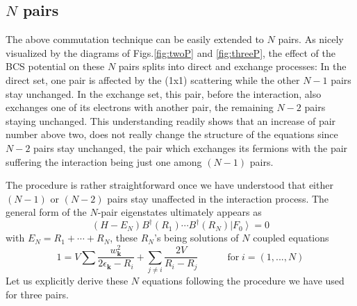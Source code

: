 \documentclass[aps,prb,superscriptaddress,showpacs,reprint,lengthcheck]{revtex4-1}
\begin{document}
\subsection{$N$ pairs}

The above commutation technique can be easily extended to $N$ pairs. As nicely
visualized by the diagrams of Figs.\ref{fig:twoP} and \ref{fig:threeP}, the
effect of the BCS potential on these $N$ pairs splits into direct and exchange processes:
In the direct set, one pair is affected by the (1x1) scattering while the other $N-1
$ pairs stay unchanged. In the exchange set, this pair, before the interaction, also 
exchanges one of its electrons with another pair, the remaining $N-2$
pairs staying unchanged. This understanding readily shows that an increase of pair number above two, does not really change the structure of the equations
since $N-2$ pairs stay unchanged, the pair which exchanges its fermions with the
pair suffering the interaction being just one among $(N-1)$ pairs.

The procedure is rather straightforward once we have understood
that either $(N-1)$ or $(N-2)$ pairs stay unaffected in the interaction process. The
general form of the $N$-pair eigenstates ultimately appears as 
\begin{equation}  \label{eq:SchThreeN}
(H-E _N)B^{\dagger}(R_1)\cdots{}B^{\dagger}(R_N)\left|F_0\right>  =0
\end{equation}
with $E _N=R_1+\cdots+R_N$, these $R_N$'s being solutions of $N$ coupled
equations 
\begin{equation}
1=V\sum\frac{w_{\mathbf{k} }^2}{2\epsilon_{\mathbf{k} }-R_i}+\sum_{j\neq{i}}%
\frac{2V}{R_i-R_j}\quad\qquad \text{for}\; i=\left(1,...,N\right) 
\end{equation}
Let us explicitly derive these $N$ equations following the procedure we have used for three pairs. 
\end{document}
